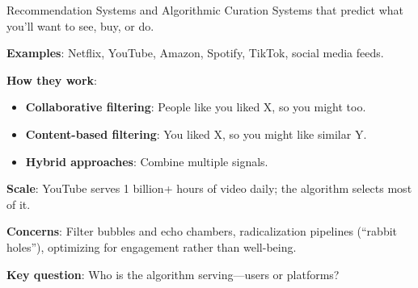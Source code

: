 ﻿\documentclass[aspectratio=169,11pt]{beamer}
\begin{document}
\begin{frame}{Recommendation Systems and Algorithmic Curation}
Systems that predict what you'll want to see, buy, or do.

\vspace{0.2em}
\textbf{Examples}: Netflix, YouTube, Amazon, Spotify, TikTok, social media feeds.

\vspace{0.2em}
\textbf{How they work}:
\begin{itemize}
    \item \textbf{Collaborative filtering}: People like you liked X, so you might too.
    \item \textbf{Content-based filtering}: You liked X, so you might like similar Y.
    \item \textbf{Hybrid approaches}: Combine multiple signals.
\end{itemize}

\vspace{0.2em}
\textbf{Scale}: YouTube serves 1 billion+ hours of video daily; the algorithm selects most of it.

\vspace{0.2em}
\textbf{Concerns}: Filter bubbles and echo chambers, radicalization pipelines (``rabbit holes''), optimizing for engagement rather than well-being.

\vspace{0.2em}
\textbf{Key question}: Who is the algorithm serving---users or platforms?
\end{frame}
\end{document}
